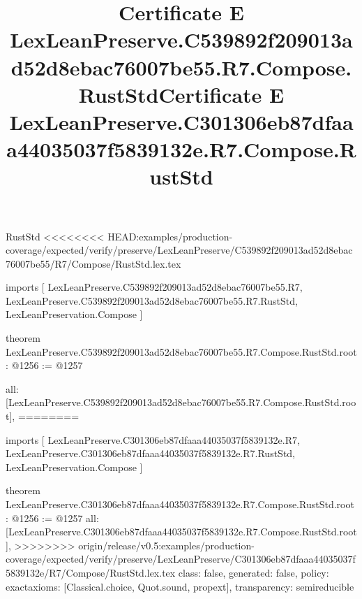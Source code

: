 \begin{lexlean}{RustStd}
<<<<<<<< HEAD:examples/production-coverage/expected/verify/preserve/LexLeanPreserve/C539892f209013ad52d8ebac76007be55/R7/Compose/RustStd.lex.tex
\title{Certificate E LexLeanPreserve.C539892f209013ad52d8ebac76007be55.R7.Compose.RustStd}
\begin{coremodule}
imports [
  LexLeanPreserve.C539892f209013ad52d8ebac76007be55.R7,
  LexLeanPreserve.C539892f209013ad52d8ebac76007be55.R7.RustStd,
  LexLeanPreservation.Compose
]

theorem LexLeanPreserve.C539892f209013ad52d8ebac76007be55.R7.Compose.RustStd.root : @1256 := @1257 {
  all: [LexLeanPreserve.C539892f209013ad52d8ebac76007be55.R7.Compose.RustStd.root],
========
\title{Certificate E LexLeanPreserve.C301306eb87dfaaa44035037f5839132e.R7.Compose.RustStd}
\begin{coremodule}
imports [
  LexLeanPreserve.C301306eb87dfaaa44035037f5839132e.R7,
  LexLeanPreserve.C301306eb87dfaaa44035037f5839132e.R7.RustStd,
  LexLeanPreservation.Compose
]

theorem LexLeanPreserve.C301306eb87dfaaa44035037f5839132e.R7.Compose.RustStd.root : @1256 := @1257 {
  all: [LexLeanPreserve.C301306eb87dfaaa44035037f5839132e.R7.Compose.RustStd.root],
>>>>>>>> origin/release/v0.5:examples/production-coverage/expected/verify/preserve/LexLeanPreserve/C301306eb87dfaaa44035037f5839132e/R7/Compose/RustStd.lex.tex
  class: false,
  generated: false,
  policy: exact{axioms: [Classical.choice, Quot.sound, propext]},
  transparency: semireducible
}


\end{coremodule}}
\end{coremodule}
\end{lexlean}
